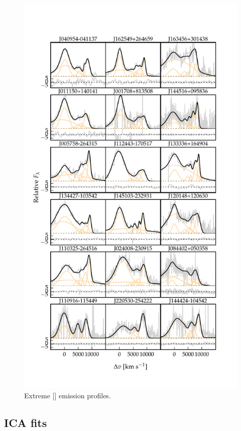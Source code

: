 \begin{figure}
    \centering
    \includegraphics[width=1\columnwidth]{figures/chapter04/example_spectrum_grid_extreme_oiii.pdf} 
    \caption{Extreme [] emission profiles.}     
    \label{fig:example_spectrum_grid_extreme_oiii}
\end{figure}


\subsection{ICA fits}

